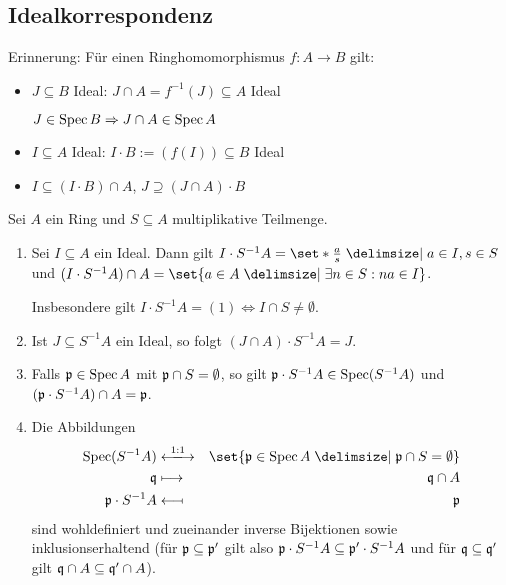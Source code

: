 \documentclass[12pt,a4paper]{scrartcl}
\theoremstyle{cplain}
\theoremstyle{cdef}
\begin{document}
\subsection{Idealkorrespondenz}
Erinnerung: Für einen Ringhomomorphismus $f\colon A\to B$ gilt:
\begin{itemize}
	\item $J\subseteq B$ Ideal: $J\cap A = f^{-1}(J)\subseteq A$ Ideal
	
	$J\in \operatorname{Spec} B \Rightarrow J\cap A \in \operatorname{Spec} A$
	\item $I\subseteq A$ Ideal: $I\cdot B := (f(I)) \subseteq B$ Ideal
	\item $I \subseteq (I\cdot B) \cap A$, $J \supseteq (J\cap A)\cdot B$
\end{itemize}
\begin{satz} \label{thm:spektrumkorrespondenz}
	Sei $A$ ein Ring und $S\subseteq A$ multiplikative Teilmenge.
	\begin{enumerate}
		\item Sei $I\subseteq A$ ein Ideal. Dann gilt $I\cdot S^{-1}A = \set*{\frac{a}{s}\given a\in I, s\in S}$ und $(I\cdot S^{-1}A)\cap A = \set{a\in A\given \exists n\in S: na \in I}$.
		
		Insbesondere gilt $I\cdot S^{-1}A = (1)\Leftrightarrow I\cap S\neq \emptyset$. \label{thm:idealkorr:i}
		\item Ist $J\subseteq S^{-1}A$ ein Ideal, so folgt $(J\cap A)\cdot S^{-1}A = J$. \label{thm:idealkorr:ii}
		\item \label{thm:idealkorr:iii} Falls $\mathfrak{p}\in\operatorname{Spec} A$ mit $\mathfrak{p}\cap S = \emptyset$, so gilt $\mathfrak{p}\cdot S^{-1}A\in \operatorname{Spec} (S^{-1}A)$ und $(\mathfrak{p}\cdot S^{-1}A)\cap A = \mathfrak{p}$.
		\item Die Abbildungen
		\begin{eqnarray*}
			\Spec(S^{-1}A) &\xlongleftrightarrow{1:1}& \set{\fp\in \Spec A \given \fp\cap S = \emptyset} \\
			\fq &\longmapsto& \fq\cap A \\
			\fp\cdot S^{-1}A &\longmapsfrom& \fp
		\end{eqnarray*}
		sind wohldefiniert und zueinander inverse Bijektionen sowie inklusionserhaltend (für $\mathfrak{p}\subseteq \mathfrak{p}'$ gilt also $\mathfrak{p}\cdot S^{-1}A\subseteq \mathfrak{p}'\cdot S^{-1}A$ und für $\mathfrak{q}\subseteq \mathfrak{q}'$ gilt $\mathfrak{q}\cap A\subseteq \mathfrak{q}'\cap A$). \label{thm:idealkorr:iv}
	\end{enumerate}
\end{satz}
\end{document}
